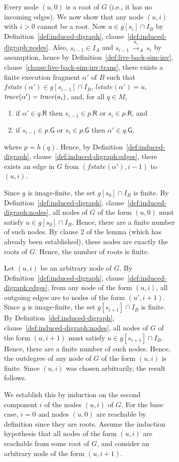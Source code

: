 \documentclass[11pt]{article}
\newcommand{\bn}{\begin{enumerate}}
\newcommand{\en}{\end{enumerate}}
\newcommand{\ints}{\cap}
\newcommand{\lla}[2]{\mbox{$\, \stackrel{#1}{\longrightarrow}_{#2} \,$}}
\newcommand{\G}{\mathsf{G}}
\newcommand{\R}{\mathsf{R}}
\newcommand{\al}{\alpha}
\newcommand{\fstate}{\mathit{fstate}}
\newcommand{\lstate}{\mathit{lstate}}
\begin{document}
\begin{figure}[htb]
\begin{figure}[htb]
\item Every node $(u,0)$ is a root of $G$ (i.e., it has no incoming
edges). We now show that any node $(u,i)$ with $i > 0$ cannot be a
root. Now $u \in g[s_i] \ints I_B$ by 
Definition~\ref{def:induced-digraph}, 
clause~\ref{def:induced-digraph:nodes}. Also,
$s_{i-1} \in I_A$ and $s_{i-1} \lla{a_i}{A} s_i$ by assumption, hence
by Definition~\ref{def:live-back-sim-inv},
clause~\ref{clause:live-back-sim-inv:trans}, 
there exists a finite execution fragment $\al'$ of $B$ such that
$\fstate(\al') \in g[s_{i-1}] \ints I_B$, 
$\lstate(\al') = u$, 
$\trace(\al') = \trace(a_i)$, and, for all $q \in M$,
   \bn

   \item if $\al' \in q.\R$ then
		$s_{i-1} \in p.\R$ or $s_i \in p.\R$, and

   \item if $s_{i-1} \in p.\G$ or $s_i \in p.\G$ then
		$\al' \in q.\G$,

   \en
where $p = h(q)$.
Hence, by Definition~\ref{def:induced-digraph},
clause~\ref{def:induced-digraph:edges}, there exists an edge in $G$ from 
$(\fstate(\al'), i-1)$ to $(u,i)$.

\item Since $g$ is image-finite, the set $g[s_0] \ints I_B$ is finite.
By Definition~\ref{def:induced-digraph},
clause~\ref{def:induced-digraph:nodes}, all nodes of $G$ of the form $(u,0)$
must satisfy $u \in g[s_0] \ints I_B$. Hence, there are a finite
number of such nodes. By clause 2 of the lemma (which has already been
established), these nodes are exactly the roots of $G$. Hence, the
number of roots is finite.

\item Let $(u,i)$ be an arbitrary node of $G$.
By Definition~\ref{def:induced-digraph},
clause~\ref{def:induced-digraph:edges},
from any node of the form $(u,i)$, all outgoing edges are to
nodes of the form $(u',i+1)$. 
Since $g$ is image-finite, the set $g[s_{i+1}] \ints I_B$ is finite.
By Definition~\ref{def:induced-digraph},
clause~\ref{def:induced-digraph:nodes}, all nodes of $G$ of the form $(u,i+1)$
must satisfy $u \in g[s_{i+1}] \ints I_B$. Hence, there are a finite
number of such nodes. Hence, the outdegree of any node of $G$ of the form 
$(u,i)$ is finite. Since $(u,i)$ was chosen arbitrarily, the result follows.

\item We establish this by induction on the second component $i$ of
the nodes $(u,i)$ of $G$.
For the base case, $i=0$ and nodes $(u,0)$ are reachable by definition
since they are roots.
Assume the induction hypothesis that all nodes of the form $(u,i)$ are
reachable from some root of $G$, and consider an arbitrary node of the
form $(u,i+1)$.


\end{figure}
\end{figure}
\end{document}
